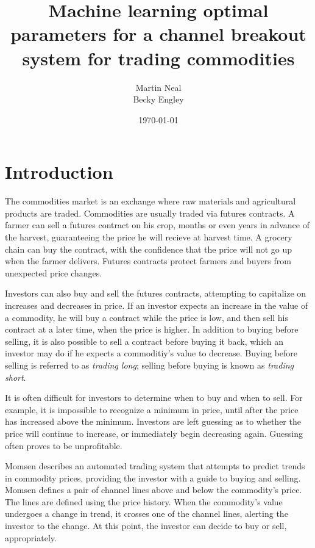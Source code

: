 \documentclass[12pt]{article}
\begin{document}
\title{Machine learning optimal parameters for a channel breakout system for trading
commodities}
\author{Martin Neal\\
  Becky Engley}
\date{\today}
\maketitle

\section{Introduction}

The commodities market is an exchange where raw materials and agricultural
products are traded. Commodities are usually traded via futures contracts. A
farmer can sell a futures contract on his crop, months or even years in advance
of the harvest, guaranteeing the price he will recieve at harvest time. A
grocery chain can buy the contract, with the confidence that the price will not
go up when the farmer delivers. Futures contracts protect farmers and buyers
from unexpected price changes.

Investors can also buy and sell the futures contracts, attempting to capitalize
on increases and decreases in price. If an investor expects an increase in the
value of a commodity, he will buy a contract while the price is low, and then
sell his contract at a later time, when the price is higher. In addition to
buying before selling, it is also possible to sell a contract before buying it
back, which an investor may do if he expects a commoditiy's value to decrease.
Buying before selling is referred to as \emph{trading long}; selling before
buying is known as \emph{trading short}.

It is often difficult for investors to determine when to buy and when to sell.
For example, it is impossible to recognize a minimum in price, until after the
price has increased above the minimum. Investors are left guessing as to
whether the price will continue to increase, or immediately begin decreasing
again. Guessing often proves to be unprofitable.

Momsen\cite{Momsen} describes an automated trading system that attempts to predict trends in
commodity prices, providing the investor with a guide to buying and selling.
Momsen defines a pair of channel lines above and below the commodity's price.
The lines are defined using the price history. When the commodity's value
undergoes a change in trend, it crosses one of the channel lines, alerting the
investor to the change. At this point, the investor can decide to buy or
sell, appropriately.
\end{document}
